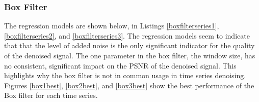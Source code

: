 \documentclass[11pt]{article}
\theoremstyle{definition}
\begin{document}
\subsubsection{Box Filter}

The regression models are shown below, in Listings \ref{boxfilterseries1}, \ref{boxfilterseries2}, and \ref{boxfilterseries3}. The regression models seem to indicate that that the level of added noise is the only significant indicator for the quality of the denoised signal. The one parameter in the box filter, the window size, has no consistent, significant impact on the PSNR of the denoised signal. This highlights why the box filter is not in common usage in time series denoising.\\

Figures \ref{box1best}, \ref{box2best}, and \ref{box3best} show the best performance of the Box filter for each time series.
\end{document}
